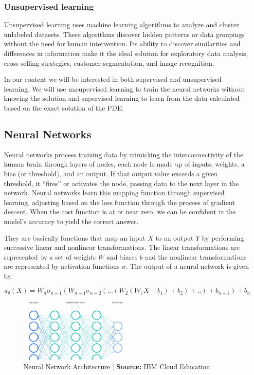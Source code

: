 \documentclass{article}
\begin{document}
\subsubsection{Unsupervised learning}
Unsupervised learning uses machine learning algorithms to analyze and cluster unlabeled datasets. These algorithms discover hidden patterns or data groupings without the need for human intervention. Its ability to discover similarities and differences in information make it the ideal solution for exploratory data analysis, cross-selling strategies, customer segmentation, and image recognition.

In our context we will be interested in both supervised and unsupervised learning. We will use unsupervised learning to train the neural networks without knowing the solution and supervised learning to learn from the data calculated based on the exact solution of the PDE.

\subsection{Neural Networks}

Neural networks process training data by mimicking the interconnectivity of the human brain through layers of nodes, each node is made up of inputs, weights, a bias (or threshold), and an output. If that output value exceeds a given threshold, it “fires” or activates the node, passing data to the next layer in the network. Neural networks learn this mapping function through supervised learning,
adjusting based on the loss function through the process of gradient descent. When the cost function is at or near zero, we can be confident in the model’s accuracy to yield the correct answer.

They are basically functions that map an input $X$ to an output $Y$ by performing successive linear and nonlinear transformations. The linear transformations are represented by a set of weights $W$ and biases $b$ and the nonlinear transformations are represented by activation functions $\sigma$. The output of a neural network is given by:

$$\overline{u_\theta}(X)=W_n\sigma_{n-1}(W_{n-1}\sigma_{n-2}(...(W_2(W_1X+b_1)+b_2)+..)+b_{n-1})+b_n$$

\begin{figure}[H]
    \centering
    \includegraphics[width=0.5\textwidth]{images/neural_network.png}
    \caption{Neural Network Architecture | \textbf{Source:} IBM Cloud Education}
\end{figure}
\end{document}
